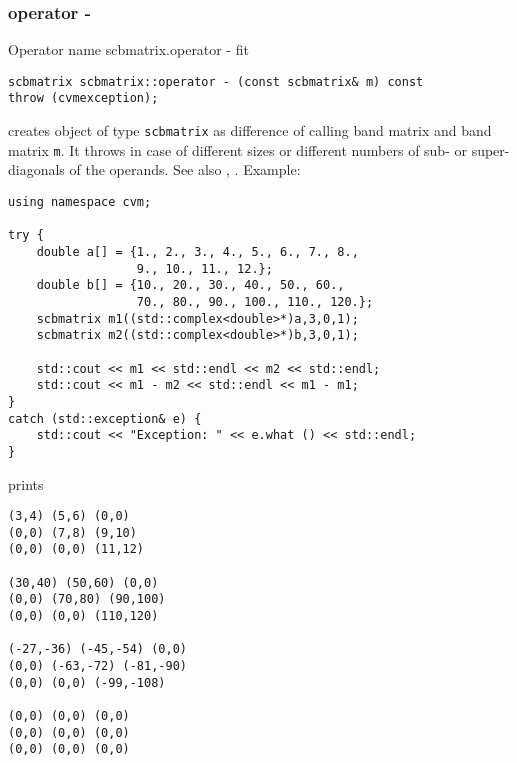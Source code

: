 \subsubsection{operator -}
Operator%
\pdfdest name {scbmatrix.operator -} fit
\begin{verbatim}
scbmatrix scbmatrix::operator - (const scbmatrix& m) const
throw (cvmexception);
\end{verbatim}
creates  object of type \verb"scbmatrix" as  difference of
 calling band matrix and  band matrix \verb"m".
It throws  
in case of different sizes or different numbers of sub- or super-diagonals
of the operands.
See also , .
Example:
\begin{Verbatim}
using namespace cvm;

try {
    double a[] = {1., 2., 3., 4., 5., 6., 7., 8.,
                  9., 10., 11., 12.};
    double b[] = {10., 20., 30., 40., 50., 60., 
                  70., 80., 90., 100., 110., 120.};
    scbmatrix m1((std::complex<double>*)a,3,0,1);
    scbmatrix m2((std::complex<double>*)b,3,0,1);

    std::cout << m1 << std::endl << m2 << std::endl;
    std::cout << m1 - m2 << std::endl << m1 - m1;
}
catch (std::exception& e) {
    std::cout << "Exception: " << e.what () << std::endl;
}
\end{Verbatim}
prints
\begin{Verbatim}
(3,4) (5,6) (0,0)
(0,0) (7,8) (9,10)
(0,0) (0,0) (11,12)

(30,40) (50,60) (0,0)
(0,0) (70,80) (90,100)
(0,0) (0,0) (110,120)

(-27,-36) (-45,-54) (0,0)
(0,0) (-63,-72) (-81,-90)
(0,0) (0,0) (-99,-108)

(0,0) (0,0) (0,0)
(0,0) (0,0) (0,0)
(0,0) (0,0) (0,0)
\end{Verbatim}
\newpage





